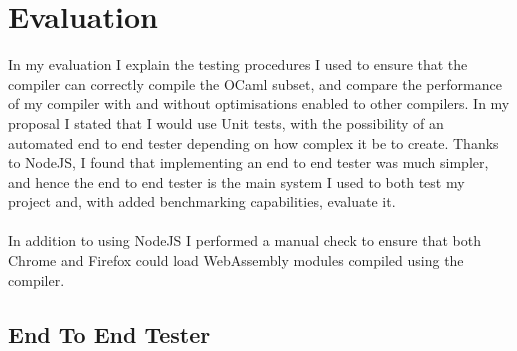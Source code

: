 \chapter{Evaluation}




In my evaluation I explain the testing procedures I used to ensure that the compiler can correctly compile the OCaml subset, and compare the performance of my compiler with and without optimisations enabled to other compilers. In my proposal I stated that I would use Unit tests, with the possibility of an automated end to end tester depending on how complex it be to create. Thanks to NodeJS, I found that implementing an end to end tester was much simpler, and hence the end to end tester is the main system I used to both test my project and, with added benchmarking capabilities, evaluate it.
\\\\
In addition to using NodeJS I performed a manual check to ensure that both Chrome and Firefox could load WebAssembly modules compiled using the compiler.

\section{End To End Tester}

